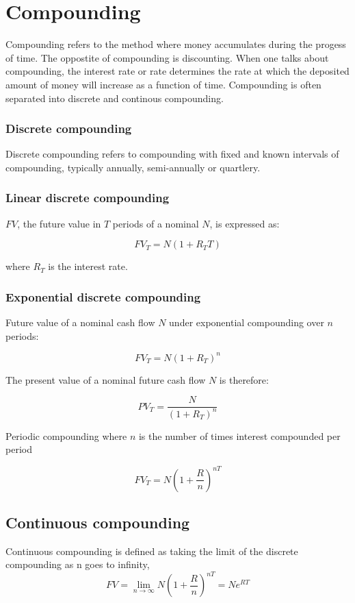 \documentclass[11pt,a4paper]{article}
\numberwithin{equation}{section}
\begin{document}
\section{Compounding}
Compounding refers to the method where money accumulates during the progess of time. The oppostite of compounding is discounting.
When one talks about compounding, the interest rate or rate determines the rate at which the deposited amount of money will increase as a function of time.
Compounding is often separated into discrete and continous compounding.

\subsubsection{Discrete compounding}
Discrete compounding refers to compounding with fixed and known intervals of compounding, typically annually, semi-annually or quartlery.

\subsubsection{Linear discrete compounding}
$FV$, the future value in $T$ periods of a nominal $N$, is expressed as:

\[
FV_T = N(1+R_TT)
\]

where $R_T$ is the interest rate.

\subsubsection{Exponential discrete compounding}

Future value of a nominal cash flow $N$ under exponential compounding over
$n$ periods:

\[ FV_T = N(1+R_T)^n \]

The present value of a nominal future cash flow $N$ is therefore:

\[ PV_T = \frac{N}{(1+R_T)^n} \]

Periodic compounding where $n$ is the number of times interest compounded per period

\[ 
FV_T=N\left( 1 + \frac{R}{n}  \right)^{nT}
\]

\subsection{Continuous compounding}
Continuous compounding is defined as taking the limit of the discrete compounding as n goes to infinity,
\[ 
FV=\lim_{n \to \infty} N \left(1+\frac{R}{n}\right)^{nT}=Ne^{RT}
\]
\end{document}
